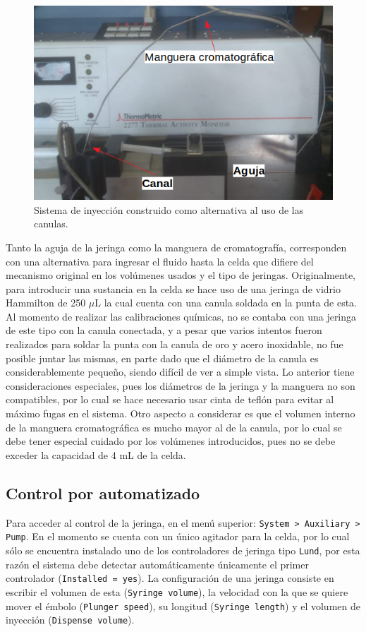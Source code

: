 	\begin{figure}[h]
		\centering
		\includegraphics[width=0.6\linewidth]{Figures/sistemaInyeccion}
		
		\caption{Sistema de inyección construido como alternativa al uso de las canulas.}
		\label{fig: sistemaInyeccion}
	\end{figure}
	
	Tanto la aguja de la jeringa como la manguera de cromatografía, corresponden con una alternativa para ingresar el fluido hasta la celda que difiere del mecanismo original en los volúmenes usados y el tipo de jeringas. Originalmente, para introducir una sustancia en la celda se hace uso de una jeringa de vidrio Hammilton de 250 $\mu$L la cual cuenta con una canula soldada en la punta de esta. Al momento de realizar las calibraciones qu\'imicas, no se contaba con una jeringa de este tipo con la canula conectada, y a pesar que varios intentos fueron realizados para soldar la punta con la canula de oro y acero inoxidable, no fue posible juntar las mismas, en parte dado que el diámetro de la canula es considerablemente pequeño, siendo difícil de ver a simple vista. Lo anterior tiene consideraciones especiales, pues los diámetros de la jeringa y la manguera no son compatibles, por lo cual se hace necesario usar cinta de teflón para evitar al máximo fugas en el sistema. Otro aspecto a considerar es que el volumen interno de la manguera cromatogr\'afica es mucho mayor al de la canula, por lo cual se debe tener especial cuidado por los volúmenes introducidos, pues no se debe exceder la capacidad de 4 mL de la celda.
	
	\subsection{Control por automatizado}\label{ssec: jeringa}
	Para acceder al control de la jeringa, en el menú superior: \texttt{System > Auxiliary > Pump}. En el momento se cuenta con un único agitador para la celda, por lo cual sólo se encuentra instalado uno de los controladores de jeringa tipo \texttt{Lund}, por esta razón el sistema debe detectar automáticamente únicamente el primer controlador (\texttt{Installed = yes}). La configuración de una jeringa consiste en escribir el volumen de esta (\texttt{Syringe volume}), la velocidad con la que se quiere mover el émbolo (\texttt{Plunger speed}), su longitud (\texttt{Syringe length}) y el volumen de inyección (\texttt{Dispense volume}).
	
